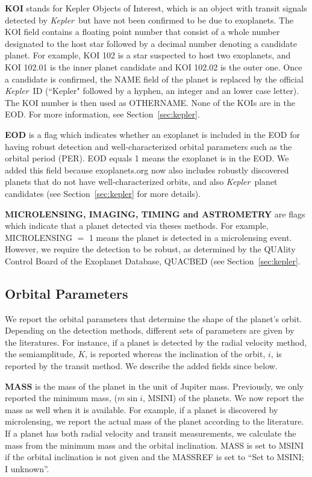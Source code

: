 \documentclass[11pt,preprint]{aastex}
\def\kepler{\textit{Kepler}}
\begin{document}
\begin{CJK*}{UTF8}{gbsn}
{\bf KOI} stands for Kepler Objects of Interest, which is an object
with transit signals detected by \kepler\ but have not been confirmed
to be due to exoplanets. The KOI field contains a floating point
number that consist of a whole number designated to the host star
followed by a decimal number denoting a candidate planet. For example,
KOI 102 is a star suspected to host two exoplanets, and KOI 102.01 is
the inner planet candidate and KOI 102.02 is the outer one. Once a
candidate is confirmed, the NAME field of the planet is replaced by
the official \kepler\ ID (``Kepler" followed by a hyphen, an integer
and an lower case letter). The KOI number is then used as
OTHERNAME. None of the KOIs are in the EOD. For more information, see
Section~\ref{sec:kepler}.

{\bf EOD} is a flag which indicates whether an exoplanet is included
in the EOD for having robust detection and well-characterized orbital
parameters such as the orbital period (PER). EOD equals 1 means the
exoplanet is in the EOD. We added this field because exoplanets.org
now also includes robustly discovered planets that do not have
well-characterized orbits, and also \kepler\ planet candidates (see
Section~\ref{sec:kepler} for more details).

{\bf MICROLENSING, IMAGING, TIMING and ASTROMETRY} are flags which
indicate that a planet detected via theses methods. For example,
MICROLENSING $=$ 1 means the planet is detected in a microlensing
event. However, we require the detection to be robust, as determined
by the QUAlity Control Board of the Exoplanet Database, QUACBED (see
Section~\ref{sec:kepler}. 


\subsection{Orbital Parameters}\label{sec:orbit}

We report the orbital parameters that determine the shape of the
planet's orbit. Depending on the detection methods, different sets of
parameters are given by the literatures. For instance, if a planet is
detected by the radial velocity method, the semiamplitude, $K$, is
reported whereas the inclination of the orbit, $i$, is reported by the
transit method. We describe the added fields since \cite{Wright2011}
below.  

{\bf MASS} is the mass of the planet in the unit of Jupiter
mass. Previously, we only reported the minimum mass, ($m\sin{i}$,
MSINI) of the planets. We now report the mass as well when it is
available. For example, if a planet is discovered by microlensing, we
report the actual mass of the planet according to the literature. If a
planet has both radial velocity and transit measurements, we calculate
the mass from the minimum mass and the orbital inclination. MASS is
set to MSINI if the orbital inclination is not given and the MASSREF
is set to ``Set to MSINI; I unknown''.  


\end{CJK*}
\end{document}
